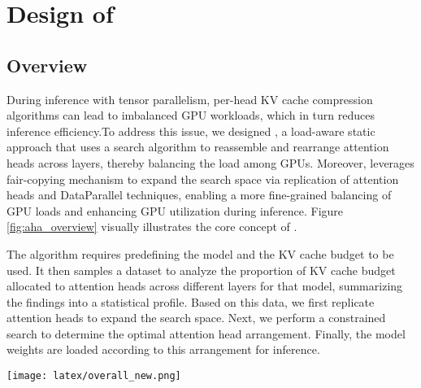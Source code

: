 \section{Design of \AlgName{}}
\subsection{Overview}


During inference with tensor parallelism, per-head KV cache compression algorithms can lead to imbalanced GPU workloads, which in turn reduces inference efficiency.To address this issue, we designed \AlgName{}, a load-aware static approach that uses a search algorithm to reassemble and rearrange attention heads across layers, thereby balancing the load among GPUs. Moreover, \AlgName{} leverages fair-copying mechanism to expand the search space via replication of attention heads and DataParallel techniques, enabling a more fine-grained balancing of GPU loads and enhancing GPU utilization during inference. Figure \ref{fig:aha_overview} visually illustrates the core concept of \AlgName{}.

The \AlgName{} algorithm requires predefining the model and the KV cache budget to be used. It then samples a dataset to analyze the proportion of KV cache budget allocated to attention heads across different layers for that model, summarizing the findings into a statistical profile. Based on this data, we first replicate attention heads to expand the search space. Next, we perform a constrained search to determine the optimal attention head arrangement. Finally, the model weights are loaded according to this arrangement for inference.

\begin{figure*}[htbp]
  \centering
  \texttt{[image: latex/overall\_new.png]} 
  \caption{Illustration of different head allocation strategies for multi-GPU inference in large-scale transformer models. The figure shows the following strategies: (1) Static Head Allocation (SHA), where attention heads are evenly distributed across GPUs without considering computational load; (2) Load-Aware Head Allocation (\AlgName{}-NoDP), where attention heads are allocated based on their computational load, ensuring a balanced GPU utilization; (3) Load-Aware Head Allocation with DataParallel (\AlgName{}-DP), where heads are replicated across GPUs for improved load distribution and efficiency; }
  \label{fig:aha_overview}
\end{figure*}

